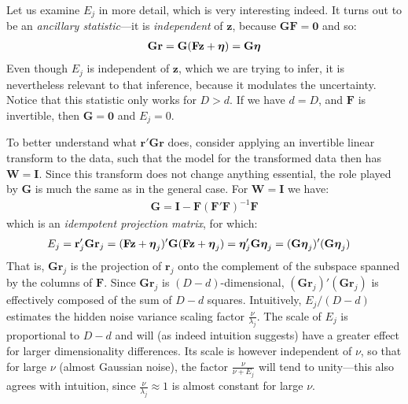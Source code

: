 \documentclass[a4paper,oneside,12pt,english]{report}
\def\zvec{\mathbf{z}}
\def\Wmat{\mathbf{W}}
\def\Fmat{\mathbf{F}}
\def\Gmat{\mathbf{G}}
\def\Imat{\mathbf{I}}
\def\Gmat{\mathbf{G}}
\def\rvec{\mathbf{r}}
\def\nulvec{\boldsymbol{0}}
\begin{document}
Let us examine $E_j$ in more detail, which is very interesting indeed. It turns out to be an \emph{ancillary statistic}---it is \emph{independent} of $\zvec$, because $\Gmat\Fmat=\nulvec$ and so: 
\begin{align}
\Gmat\rvec=\Gmat(\Fmat\zvec+\etavec)=\Gmat\etavec
\end{align}
Even though $E_j$ is independent of $\zvec$, which we are trying to infer, it is nevertheless relevant to that inference, because it modulates the uncertainty. Notice that this statistic only works for $D> d$. If we have $d=D$, and $\Fmat$ is invertible, then $\Gmat=\nulvec$ and $E_j=0$.

To better understand what $\rvec'\Gmat\rvec$ does, consider applying an invertible linear transform to the data, such that the model for the transformed data then has $\Wmat=\Imat$. Since this transform does not change anything essential, the role played by $\Gmat$ is much the same as in the general case. For $\Wmat=\Imat$ we have:
\begin{align*}
\Gmat=\Imat - \Fmat(\Fmat'\Fmat)^{-1}\Fmat
\end{align*}
which is an \emph{idempotent projection matrix}, for which:
\begin{align*}
E_j &= \rvec_j'\Gmat\rvec_j = (\Fmat\zvec+\etavec_j)'\Gmat(\Fmat\zvec+\etavec_j) = \etavec_j'\Gmat\etavec_j = (\Gmat\etavec_j)'(\Gmat\etavec_j)
\end{align*}
That is, $\Gmat\rvec_j$ is the projection of $\rvec_j$ onto the complement of the subspace spanned by the columns of $\Fmat$. Since $\Gmat\rvec_j$ is $(D-d)$-dimensional, $(\Gmat\rvec_j)'(\Gmat\rvec_j)$ is effectively composed of the sum of $D-d$ squares. Intuitively, $E_j/(D-d)$ estimates the hidden noise variance scaling factor $\frac{\nu}{\lambda_j}$. The scale of $E_j$ is proportional to $D-d$ and will (as indeed intuition suggests) have a greater effect for larger dimensionality differences. Its scale is however independent of $\nu$, so that for large $\nu$ (almost Gaussian noise), the factor $\frac{\nu}{\nu+E_j}$ will tend to unity---this also agrees with intuition, since $\frac{\nu}{\lambda_j}\approx 1$ is almost constant for large $\nu$. 
\end{document}
